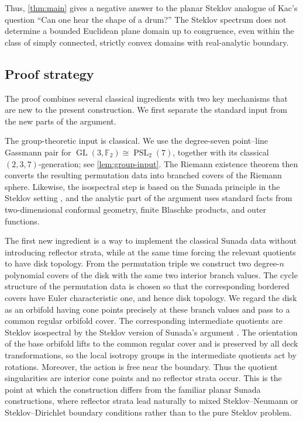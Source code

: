 \documentclass[11pt,letterpaper,reqno]{amsart}
\theoremstyle{definition}
\newcommand{\Ftwo}{\mathbb F_2}
\begin{document}
Thus, \cref{thm:main} gives a negative answer to the planar Steklov
analogue of Kac's question ``Can one hear the shape of a drum?''
The Steklov spectrum does not determine a bounded Euclidean plane
domain up to congruence, even within the class of simply connected,
strictly convex domains with real-analytic boundary.



\subsection{Proof strategy}

The proof combines several classical ingredients with two key
mechanisms that are new to the present construction.  We first
separate the standard input from the new parts of the argument.

The group-theoretic input is classical.  We use the degree-seven
point--line Gassmann pair for
$\operatorname{GL}(3,\Ftwo)\cong\operatorname{PSL}_2(7)$, together
with its classical $(2,3,7)$-generation; see
\cref{lem:group-input}.  The Riemann existence theorem then converts
the resulting permutation data into branched covers of the Riemann
sphere.  Likewise, the isospectral step is based on the Sunada
principle in the Steklov setting
\cite{ColboisGirouardGordonSher2024,GordonHerbrichWebb2021}, and the
analytic part of the argument uses standard facts from two-dimensional
conformal geometry, finite Blaschke products, and outer functions.

The first new ingredient is a way to implement the classical Sunada
data without introducing reflector strata, while at the same time
forcing the relevant quotients to have disk topology. From the permutation
triple we construct two degree-$n$ polynomial covers of the disk with
the same two interior branch values. The cycle structure of the permutation data is chosen so that the corresponding bordered covers have Euler characteristic one, and hence disk topology. We regard the disk as an
orbifold having cone points precisely at these branch values and pass
to a common regular orbifold cover. The corresponding intermediate
quotients are Steklov isospectral by the Steklov version of Sunada's
argument \cite[Theorem~2.3 and Remark~2.6]{GordonHerbrichWebb2021}.  The orientation of the base orbifold lifts to the common regular
cover and is preserved by all deck transformations, so the local
isotropy groups in the intermediate quotients act by rotations.
Moreover, the action is free near the boundary.  Thus the quotient
singularities are interior cone points and no reflector strata occur.  This is the point
at which the construction differs from the familiar planar Sunada
constructions, where reflector strata lead naturally to mixed
Steklov--Neumann or Steklov--Dirichlet boundary conditions rather than
to the pure Steklov problem.
\end{document}
